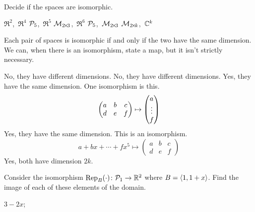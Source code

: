 \begin{exercises}
  \recommended \item 
    Decide if the spaces are isomorphic.
    \begin{exparts*}
       \partsitem \( \Re^2 \),~\( \Re^4 \)
       \partsitem \( \mathcal{P}_5 \),~\( \Re^5 \)
       \partsitem \( \mathcal{M}_{2 \! \times \! 3} \),~\( \Re^6 \)
       \partsitem \( \mathcal{P}_5 \),~\( \mathcal{M}_{2 \! \times \! 3} \)
       \partsitem \( \mathcal{M}_{2 \! \times \! k} \),~\( \mathbb{C}^k \)
    \end{exparts*}
    \begin{answer}
       Each pair of spaces is isomorphic if and only if the two have the 
       same dimension.
       We can, when there is an isomorphism, state
       a map, but it isn't strictly necessary.
       \begin{exparts}
         \partsitem No, they have different dimensions.
         \partsitem No, they have different dimensions.
         \partsitem Yes, they have the same dimension. 
           One isomorphism is this.
           \begin{equation*}
             \begin{pmatrix}
               a  &b  &c  \\
               d  &e  &f
             \end{pmatrix}
             \mapsto
             \begin{pmatrix} a \\ \vdots \\ f \end{pmatrix}
           \end{equation*}
         \partsitem Yes, they have the same dimension.
           This is an isomorphism.
           \begin{equation*}
             a+bx+\cdots+fx^5
             \mapsto
             \begin{pmatrix}
               a  &b  &c  \\
               d  &e  &f
             \end{pmatrix}
           \end{equation*}
         \partsitem Yes, both have dimension \( 2k \).      
      \end{exparts}    
    \end{answer}
  \recommended \item 
    Consider the isomorphism
    \( \mbox{${\rm Rep}_{B}(\cdot)\colon \mathcal{P}_1\to \mathbb{R}^2$} \) 
    where \( B=\langle1,1+x\rangle \).
    Find the image of each of these elements of the domain.
    \begin{exparts*}
      \partsitem \( 3-2x \);

\end{exparts*}
\end{exercises}
